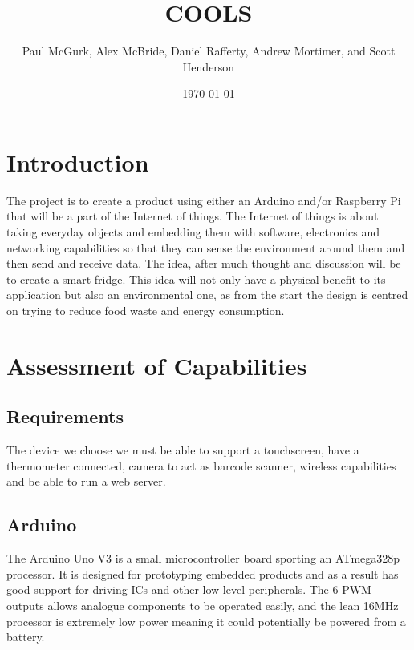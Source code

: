 \documentclass[10pt]{article}
\title{COOLS}
\author{Paul McGurk, Alex McBride, Daniel Rafferty, Andrew Mortimer, and Scott Henderson}
\date{\today}
\begin{document}
\begin{titlepage}
\maketitle
\end{titlepage}

\linespread{1.15} %
\renewcommand{\arraystretch}{1.2} %

\tableofcontents

\newpage
\section{Introduction}

The project is to create a product using either an Arduino and/or Raspberry Pi that will be a part of the Internet of things. The Internet of things is about taking everyday objects and embedding them with software, electronics and networking capabilities so that they can sense the environment around them and then send and receive data. The idea, after much thought and discussion will be to create a smart fridge. This idea will not only have a physical benefit to its application but also an environmental one, as from the start the design is centred on trying to reduce food waste and energy consumption.

\newpage
\section{Assessment of Capabilities}

\subsection{Requirements}

The device we choose we must be able to support a touchscreen, have a thermometer connected, camera to act as barcode scanner, wireless capabilities and be able to run a web server.

\subsection{Arduino}
The Arduino Uno V3 is a small microcontroller board sporting an ATmega328p processor. It is designed for prototyping embedded products and as a result has good support for driving ICs and other low-level peripherals. The 6 PWM outputs allows analogue components to be operated easily, and the lean 16MHz processor is extremely low power meaning it could potentially be powered from a battery.
\end{document}
